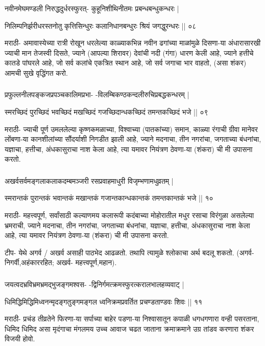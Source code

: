 \begin{frame}[fragile]\frametitle{}
नवीनमेघमण्डली निरुद्धदुर्धरस्फुरत्- कुहूनिशीथिनीतमः प्रबन्धबन्धुकन्धरः | 

निलिम्पनिर्झरीधरस्तनोतु कृत्तिसिन्धुरः कलानिधानबन्धुरः श्रियं जगद्धुरन्धरः || ०८ 


मराठी- अमावास्येच्या रात्री रोखून धरलेल्या काळ्याकभिन्न नवीन ढगांच्या माळांमुळे दिसणा-या अंधारासारखी ज्याची मान तेजस्वी दिसते, ज्याने (आपल्या शिरावर) देवांची नदी (गंगा) धारण केली आहे, ज्याने हत्तीचे कातडे पांघरले आहे, जो सर्व कलांचे एकत्रित स्थान आहे, जो सर्व जगाचा भार वाहतो, (असा शंकर) आमची सुखे वृद्धिंगत करो. 
\end{frame}

\begin{frame}[fragile]\frametitle{}

प्रफुल्लनीलपङ्कजप्रपञ्चकालिमप्रभा- -विलम्बिकण्ठकन्दलीरुचिप्रबद्धकन्धरम् | 

स्मरच्छिदं पुरच्छिदं भवच्छिदं मखच्छिदं गजच्छिदान्धकच्छिदं तमन्तकच्छिदं भजे || ०९ 


मराठी- ज्याची पूर्ण उमललेल्या कृष्णकमळाच्या, विश्वाच्या (पातकांच्या) समान, काळ्या रंगाची ग्रीवा मानेवर लोंबणा-या कानशीलांच्या सौंदर्याशी निगडीत झाली आहे, ज्याने मदनाचा, तीन नगरांचा, जगताच्या बंधनांचा, यज्ञाचा, हत्तीचा, अंधकासुराचा नाश केला आहे, त्या यमावर नियंत्रण ठेवणा-या (शंकरा) ची मी उपासना करतो. 
\end{frame}

\begin{frame}[fragile]\frametitle{}

अखर्वसर्वमङ्गलाकलाकदम्बमञ्जरी रसप्रवाहमाधुरी विजृम्भणामधुव्रतम् |

स्मरान्तकं पुरान्तकं भवान्तकं मखान्तकं गजान्तकान्धकान्तकं तमन्तकान्तकं भजे || १० 


मराठी- महत्त्वपूर्ण, सर्वांसाठी कल्याणमय कलारूपी कदंबाच्या मोहोरातील मधुर रसाचा विरंगुळा असलेल्या भ्रमराची, ज्याने मदनाचा, तीन नगरांचा, जगताच्या बंधनांचा, यज्ञाचा, हत्तीचा, अंधकासुराचा नाश केला आहे, त्या यमावर नियंत्रण ठेवणा-या (शंकरा) ची मी उपासना करतो. 

टीप- येथे अगर्व / अखर्व असाही पाठभेद आढळतो. तथापि त्यामुळे श्लोकाचा अर्थ बदलू शकतो. (अगर्व- निगर्वी,अहंकाररहित; अखर्व- महत्त्वपूर्ण,महान). 
\end{frame}

\begin{frame}[fragile]\frametitle{}
जयत्वदभ्रविभ्रमभ्रमद्भुजङ्गमश्वस- -द्विनिर्गमत्क्रमस्फुरत्करालभालहव्यवाट् | 

धिमिद्धिमिद्धिमिध्वनन्मृदङ्गतुङ्गमङ्गल ध्वनिक्रमप्रवर्तित प्रचण्डताण्डवः शिवः || ११ 


मराठी- प्रचंड तीव्रतेने फिरणा-या सर्पाच्या बाहेर पडणा-या निश्वासातून कपाळी धगधगणारा वन्ही पसरताना, धिमिद धिमिद असा मृदंगाचा मंगलमय उच्च आवाज चढत जाताना क्रमाक्रमाने उग्र तांडव करणारा शंकर विजयी होवो. 
\end{frame}

